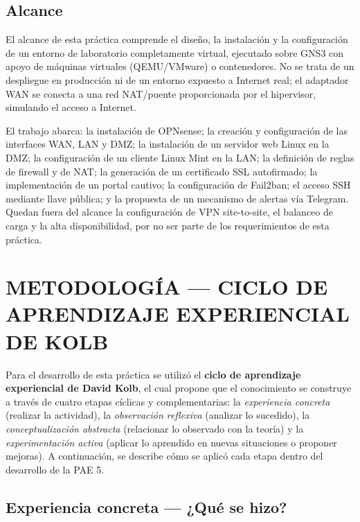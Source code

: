 \documentclass{article}
\renewcommand{\_}{\oldunderscore\hskip0pt\relax}
\begin{document}
\hypertarget{alcance}{%
\subsection{Alcance}\label{alcance}}

El alcance de esta práctica comprende el diseño, la instalación y la
configuración de un entorno de laboratorio completamente virtual,
ejecutado sobre GNS3 con apoyo de máquinas virtuales (QEMU/VMware) o
contenedores. No se trata de un despliegue en producción ni de un
entorno expuesto a Internet real; el adaptador WAN se conecta a una red
NAT/puente proporcionada por el hipervisor, simulando el acceso a
Internet.

El trabajo abarca: la instalación de OPNsense; la creación y
configuración de las interfaces WAN, LAN y DMZ; la instalación de un
servidor web Linux en la DMZ; la configuración de un cliente Linux Mint
en la LAN; la definición de reglas de firewall y de NAT; la generación
de un certificado SSL autofirmado; la implementación de un portal
cautivo; la configuración de Fail2ban; el acceso SSH mediante llave
pública; y la propuesta de un mecanismo de alertas vía Telegram. Quedan
fuera del alcance la configuración de VPN site-to-site, el balanceo de
carga y la alta disponibilidad, por no ser parte de los requerimientos
de esta práctica.

\hypertarget{metodologuxeda-ciclo-de-aprendizaje-experiencial-de-kolb}{%
\section{METODOLOGÍA --- CICLO DE APRENDIZAJE EXPERIENCIAL DE
KOLB}\label{metodologuxeda-ciclo-de-aprendizaje-experiencial-de-kolb}}

Para el desarrollo de esta práctica se utilizó el \textbf{ciclo de
aprendizaje experiencial de David Kolb}, el cual propone que el
conocimiento se construye a través de cuatro etapas cíclicas y
complementarias: la \emph{experiencia concreta} (realizar la actividad),
la \emph{observación reflexiva} (analizar lo sucedido), la
\emph{conceptualización abstracta} (relacionar lo observado con la
teoría) y la \emph{experimentación activa} (aplicar lo aprendido en
nuevas situaciones o proponer mejoras). A continuación, se describe cómo
se aplicó cada etapa dentro del desarrollo de la PAE 5.

\hypertarget{experiencia-concreta-quuxe9-se-hizo}{%
\subsection{Experiencia concreta --- ¿Qué se
hizo?}\label{experiencia-concreta-quuxe9-se-hizo}}
\end{document}
